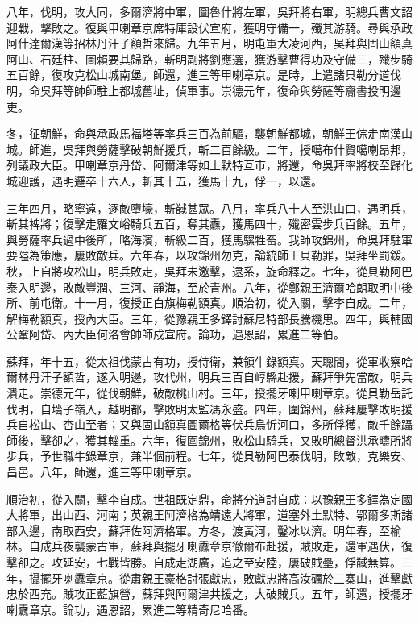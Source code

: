 \begin{pinyinscope}
八年，伐明，攻大同，多爾濟將中軍，圖魯什將左軍，吳拜將右軍，明總兵曹文詔迎戰，擊敗之。復與甲喇章京席特庫設伏宣府，獲明守備一，殲其游騎。尋與承政阿什達爾漢等招林丹汗子額哲來歸。九年五月，明屯軍大凌河西，吳拜與固山額真阿山、石廷柱、圖賴要其歸路，斬明副將劉應選，獲游擊曹得功及守備三，殲步騎五百餘，復攻克松山城南堡。師還，進三等甲喇章京。是時，上遣諸貝勒分道伐明，命吳拜等帥師駐上都城舊址，偵軍事。崇德元年，復命與勞薩等齎書投明邊吏。

冬，征朝鮮，命與承政馬福塔等率兵三百為前驅，襲朝鮮都城，朝鮮王倧走南漢山城。師進，吳拜與勞薩擊破朝鮮援兵，斬二百餘級。二年，授噶布什賢噶喇昂邦，列議政大臣。甲喇章京丹岱、阿爾津等如土默特互市，將還，命吳拜率將校至歸化城迎護，遇明邏卒十六人，斬其十五，獲馬十九，俘一，以還。

三年四月，略寧遠，逐敵墮壕，斬馘甚眾。八月，率兵八十人至洪山口，遇明兵，斬其裨將；復擊走羅文峪騎兵五百，奪其纛，獲馬四十，殲密雲步兵百餘。五年，與勞薩率兵過中後所，略海濱，斬級二百，獲馬騾牲畜。我師攻錦州，命吳拜駐軍要隘為策應，屢敗敵兵。六年春，以攻錦州勿克，論統師王貝勒罪，吳拜坐罰鍰。秋，上自將攻松山，明兵敗走，吳拜未邀擊，逮系，旋命釋之。七年，從貝勒阿巴泰入明邊，敗敵豐潤、三河、靜海，至於青州。八年，從鄭親王濟爾哈朗取明中後所、前屯衛。十一月，復授正白旗梅勒額真。順治初，從入關，擊李自成。二年，解梅勒額真，授內大臣。三年，從豫親王多鐸討蘇尼特部長騰機思。四年，與輔國公鞏阿岱、內大臣何洛會帥師戍宣府。論功，遇恩詔，累進二等伯。

蘇拜，年十五，從太祖伐蒙古有功，授侍衛，兼領牛錄額真。天聰間，從軍收察哈爾林丹汗子額哲，遂入明邊，攻代州，明兵三百自崞縣赴援，蘇拜爭先當敵，明兵潰走。崇德元年，從伐朝鮮，破敵桃山村。三年，授擺牙喇甲喇章京。從貝勒岳託伐明，自墻子嶺入，越明都，擊敗明太監馮永盛。四年，圍錦州，蘇拜屢擊敗明援兵自松山、杏山至者；又與固山額真圖爾格等伏兵烏忻河口，多所俘獲，敵千餘躡師後，擊卻之，獲其輜重。六年，復圍錦州，敗松山騎兵，又敗明總督洪承疇所將步兵，予世職牛錄章京，兼半個前程。七年，從貝勒阿巴泰伐明，敗敵，克樂安、昌邑。八年，師還，進三等甲喇章京。

順治初，從入關，擊李自成。世祖既定鼎，命將分道討自成：以豫親王多鐸為定國大將軍，出山西、河南；英親王阿濟格為靖遠大將軍，道塞外土默特、鄂爾多斯諸部入邊，南取西安，蘇拜佐阿濟格軍。方冬，渡黃河，鑿冰以濟。明年春，至榆林。自成兵夜襲蒙古軍，蘇拜與擺牙喇纛章京徹爾布赴援，賊敗走，還軍遇伏，復擊卻之。攻延安，七戰皆勝。自成走湖廣，追之至安陸，屢破賊壘，俘馘無算。三年，攝擺牙喇纛章京。從肅親王豪格討張獻忠，敗獻忠將高汝礪於三寨山，進擊獻忠於西充。賊攻正藍旗營，蘇拜與阿爾津共援之，大破賊兵。五年，師還，授擺牙喇纛章京。論功，遇恩詔，累進二等精奇尼哈番。


\end{pinyinscope}
